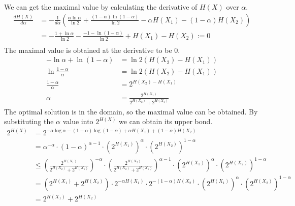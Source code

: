 \begin{exercise}
\begin{solution}
\begin{enumerate}
{        We can get the maximal value by calculating the derivative of $H(X)$ over $\alpha$.
        \begin{equation}
          \begin{aligned}
            \frac{dH(X)}{d\alpha} &= - \frac{1}{d\alpha} \left(\frac{\alpha \ln \alpha}{\ln 2} + \frac{(1-\alpha)\ln(1-\alpha)}{\ln 2} - \alpha H(X_1) - (1-\alpha) H(X_2) \right) \\
            &= - \frac{1 + \ln \alpha}{\ln 2} - \frac{-1 - \ln(1-\alpha)}{\ln 2} + H(X_1) -H(X_2) := 0 \\
          \end{aligned}
        \end{equation}
        The maximal value is obtained at the derivative to be $0$.
        \begin{equation}
          \begin{aligned}
            -\ln \alpha + \ln (1-\alpha) &= \ln2 \left(H(X_2)-H(X_1)\right) \\
            \ln \frac{1-\alpha}{\alpha} &= \ln2 \left(H(X_2)-H(X_1)\right) \\
            \frac{1-\alpha}{\alpha} &= 2^{H(X_2)-H(X_1)} \\
            \alpha &= \frac{2^{H(X_1)}}{2^{H(X_2)}+2^{H(X_1)}}
          \end{aligned}
          \label{eqn:ex7}
        \end{equation}
        The optimal solution is in the domain, so the maximal value can be obtained. By substituting the $\alpha$ value into $2^{H(X)}$ we can obtain its upper bond.
        \begin{equation}
        \begin{aligned}
          2^{H(X)} &= 2^{- \alpha \log \alpha - (1-\alpha) \log (1-\alpha) + \alpha H(X_1) + (1-\alpha) H(X_2)} \\
          &= \alpha ^{-\alpha} \cdot (1-\alpha)^{\alpha - 1} \cdot \left(2^{H(X_1)}\right)^{\alpha} \cdot \left(2^{H(X_2)}\right)^{1-\alpha} \\
          &\le \left( \frac{2^{H(X_1)}}{2^{H(X_2)}+2^{H(X_1)}}\right) ^{-\alpha} \cdot \left( \frac{2^{H(X_2)}}{2^{H(X_2)}+2^{H(X_1)}}\right)^{\alpha - 1} \cdot \left(2^{H(X_1)}\right)^{\alpha} \cdot \left(2^{H(X_2)}\right)^{1-\alpha} \\
          &= \left(2^{H(X_1)}+2^{H(X_2)}\right) \cdot 2^{-\alpha H(X_1)} \cdot 2^{-(1-\alpha) H(X_2)}  \cdot \left(2^{H(X_1)}\right)^{\alpha} \cdot \left(2^{H(X_2)}\right)^{1-\alpha} \\
          &= 2^{H(X_1)}+2^{H(X_2)}
        \end{aligned}
        \end{equation}

}
\end{enumerate}
\end{solution}
\end{exercise}
